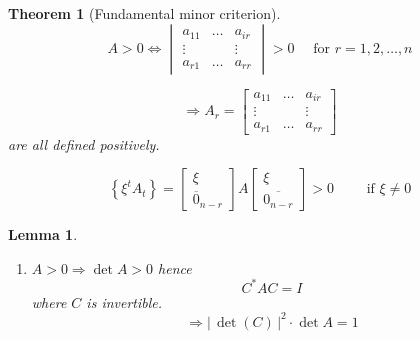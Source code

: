\documentclass[a4paper,landscape,twocolumn]{article}
\newcommand\abs[1]{|\,#1\,|}
\newcommand\set[1]{\left\{#1\right\}}
\newtheorem{theorem}{Theorem}
\newtheorem{lemma}{Lemma}
\begin{document}
\begin{theorem}[Fundamental minor criterion]
  \[
    A > 0
    \Leftrightarrow
    \begin{vmatrix}
      a_{11} & \ldots & a_{ir} \\
      \vdots &        & \vdots \\
      a_{r1} & \ldots & a_{rr}
    \end{vmatrix}
    > 0
    \quad \text{ for } r = 1,2,\ldots,n
  \]

  \[
    \Rightarrow
    A_r =
    \begin{bmatrix}
      a_{11} & \ldots & a_{ir} \\
      \vdots &        & \vdots \\
      a_{r1} & \ldots & a_{rr}
    \end{bmatrix}
  \]
  are all defined positively.

  \[
    \set{\xi^t A_t} = \begin{bmatrix}
      \xi \\ \overline{0}_{n-r}
    \end{bmatrix} A \begin{bmatrix}
      \xi \\ \overline{0_{n-r}}
    \end{bmatrix}
    > 0
    \qquad \text{ if } \xi \neq 0
  \]
\end{theorem}

\begin{lemma}
  \label{lemma-8.30}
  \begin{enumerate}
    \item[4.]
      $A > 0 \Rightarrow \det{A} > 0$
      hence
      \[ C^* A C = I \]
      where $C$ is invertible.
      \[ \Rightarrow \abs{\det(C)}^2 \cdot \det{A} = 1 \]
  \end{enumerate}
\end{lemma}
\end{document}

